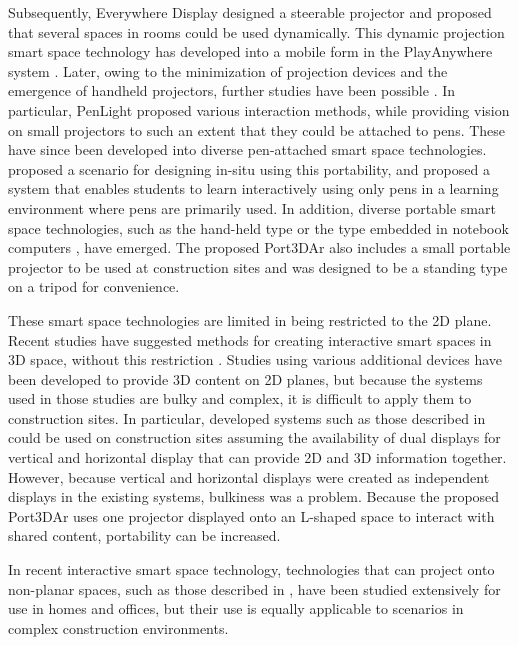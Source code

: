 Subsequently, Everywhere Display \cite{pinhanez_everywhere_2001, sukaviriya_portable_2004} designed a steerable projector and proposed that several spaces in rooms could be used dynamically. This dynamic projection smart space technology has developed into a mobile form in the PlayAnywhere system \cite{wilson_playanywhere:_2005}. Later, owing to the minimization of projection devices and the emergence of handheld projectors, further studies have been possible \cite{cao_interacting_2006, raskar_rfig_2004}. In particular, PenLight \cite{song_penlight:_2009} proposed various interaction methods, while providing vision on small projectors to such an extent that they could be attached to pens. These have since been developed into diverse pen-attached smart space technologies. \cite{kim_ar_2013} proposed a scenario for designing in-situ using this portability, and \cite{kim_ar_2014} proposed a system that enables students to learn interactively using only pens in a learning environment where pens are primarily used. In addition, diverse portable smart space technologies, such as the hand-held type \cite{huber_lightbeam:_2012, kim_ilight:_2010} or the type embedded in notebook computers \cite{kane_bonfire:_2009}, have emerged. The proposed Port3DAr also includes a small portable projector to be used at construction sites and was designed to be a standing type on a tripod for convenience.

These smart space technologies are limited in being restricted to the 2D plane. Recent studies have suggested methods for creating interactive smart spaces in 3D space, without this restriction \cite{grossman__2010}. Studies using various additional devices have been developed to provide 3D content on 2D planes, but because the systems used in those studies are bulky and complex, it is difficult to apply them to construction sites. In particular, developed systems such as those described in \cite{benko_miragetable:_2012, weiss_benddesk:_2010, wimmer_curve:_2010} could be used on construction sites assuming the availability of dual displays for vertical and horizontal display that can provide 2D and 3D information together. However, because vertical and horizontal displays were created as independent displays in the existing systems, bulkiness was a problem. Because the proposed Port3DAr uses one projector displayed onto an L-shaped space to interact with shared content, portability can be increased.

In recent interactive smart space technology, technologies that can project onto non-planar spaces, such as those described in \cite{jones_illumiroom:_2013, steimle_flexpad:_2013}, have been studied extensively for use in homes and offices, but their use is equally applicable to scenarios in complex construction environments.







